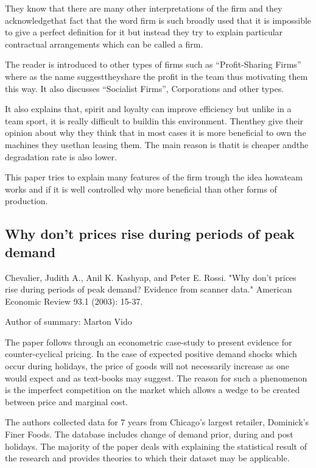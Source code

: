 \documentclass[12pt]{report}
\numberwithin{equation}{section}
\begin{document}
They know that there are many other interpretations of the firm and they acknowledgethat fact that the word firm is such broadly used that it is impossible to give a perfect definition for it but instead they try to explain particular contractual arrangements which can be called a firm.

The reader is introduced to other types of firms such as “Profit-Sharing Firms” where as the  name suggesttheyshare  the  profit  in  the  team  thus motivating  them this way. It also discusses “Socialist Firms”, Corporations and other types.

It  also  explains  that, spirit  and  loyalty  can  improve  efficiency  but  unlike  in  a  team  sport, it  is  really difficult to buildin this environment. Thenthey give their opinion about why they think that in most cases it is more beneficial to own the machines they usethan leasing them. The main reason is thatit is cheaper andthe degradation rate is also lower.

This paper tries to explain many features of the firm trough the idea howateam works and if it is well controlled why more beneficial than other forms of production. 

\newpage

\subsection{Why don’t prices rise during periods of peak demand}

Chevalier, Judith A., Anil K. Kashyap, and Peter E. Rossi. "Why don't prices rise during periods of peak demand? Evidence from scanner data." American Economic Review 93.1 (2003): 15-37.

Author of summary: Marton Vido

The paper follows through an econometric case-study to present evidence for counter-cyclical pricing. In the case of expected positive demand shocks which occur during holidays, the price of goods will not necessarily increase as one would expect and as text-books may suggest. The reason for such a phenomenon is the imperfect competition on the market which allows a wedge to be created between price and marginal cost.

The authors collected data for 7 years from Chicago’s largest retailer, Dominick's Finer Foods. The database includes change of demand prior, during and post holidays. The majority of the paper deals with explaining the statistical result of the research and provides theories to which their dataset may be applicable.
\end{document}
